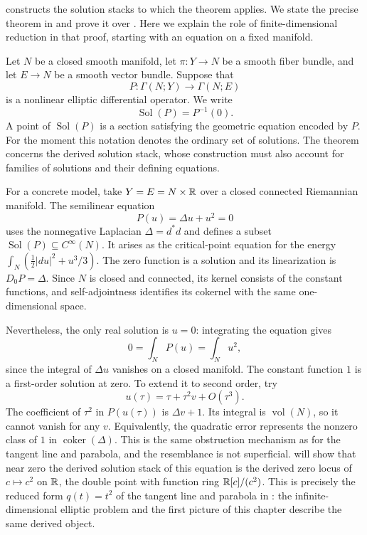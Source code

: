  constructs the solution stacks
to which the theorem applies. We state the precise theorem in
 and prove it over
.
Here we explain the role of finite-dimensional reduction in that proof,
starting with an equation on a fixed manifold.

Let $N$ be a closed smooth manifold, let $\pi\colon Y\to N$ be a smooth fiber
bundle, and let $E\to N$ be a smooth vector bundle. Suppose that
\[
  P\colon\Gamma(N;Y)\longrightarrow\Gamma(N;E)
\]
is a nonlinear elliptic differential operator. We write
\[
  \operatorname{Sol}(P)=P^{-1}(0).
\]
A point of $\operatorname{Sol}(P)$ is a section satisfying the geometric
equation encoded by $P$. For the moment this notation denotes the ordinary
set of solutions. The theorem concerns the derived solution stack, whose
construction must also account for families of solutions and their defining
equations.

For a concrete model, take $Y=E=N\times\mathbb{R}$ over a closed connected
Riemannian manifold. The semilinear equation
\[
  P(u)=\Delta u+u^2=0
\]
uses the nonnegative Laplacian $\Delta=d^*d$ and defines a subset
$\operatorname{Sol}(P)\subseteq C^\infty(N)$. It arises
as the critical-point equation for the energy
$\int_N(\tfrac12|du|^2+u^3/3)$. The zero function is a solution and its linearization is
$D_0P=\Delta$. Since $N$ is closed and connected, its kernel consists of the
constant functions, and self-adjointness identifies its cokernel with the same
one-dimensional space.

Nevertheless, the only real solution is $u=0$: integrating the equation gives
\[
  0=\int_N P(u)=\int_N u^2,
\]
since the integral of $\Delta u$ vanishes on a closed manifold. The constant
function $1$ is a first-order solution at zero. To extend it to second order,
try
\[
  u(\tau)=\tau+\tau^2v+O(\tau^3).
\]
The coefficient of $\tau^2$ in $P(u(\tau))$ is $\Delta v+1$. Its integral
is $\operatorname{vol}(N)$, so it cannot vanish for any $v$. Equivalently,
the quadratic error represents the nonzero class of $1$ in
$\operatorname{coker}(\Delta)$. This is the same obstruction mechanism as
for the tangent line and parabola, and the resemblance is not superficial.
 will show that near zero the
derived solution stack of this equation is the derived zero locus of
$c\mapsto c^2$ on $\mathbb{R}$, the double point with function ring
$\mathbb{R}[c]/(c^2)$. This is precisely the reduced form $q(t)=t^2$ of the
tangent line and parabola in : the
infinite-dimensional elliptic problem and the first picture of this
chapter describe the same derived object.

